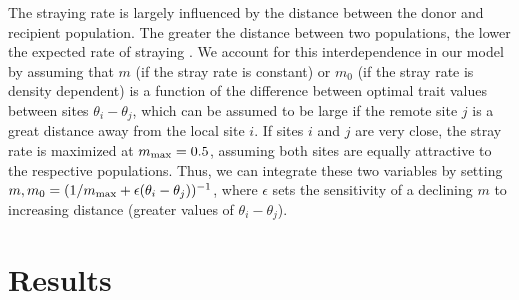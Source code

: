 \documentclass[twocolumn,preprintnumbers,amsmath,amssymb,superscriptaddress]{revtex4}
\begin{document}
The straying rate is largely influenced by the distance between the donor and recipient population.
The greater the distance between two populations, the lower the expected rate of straying \cite{H:2013fs,Westley:2015to}.
We account for this interdependence in our model by assuming that $m$ (if the stray rate is constant) or $m_0$ (if the stray rate is density dependent) is a function of the difference between optimal trait values between sites $\theta_i-\theta_j$, which can be assumed to be large if the remote site $j$ is a great distance away from the local site $i$.
If sites $i$ and $j$ are very close, the stray rate is maximized at $m_{\rm max} = 0.5$, assuming both sites are equally attractive to the respective populations.
Thus, we can integrate these two variables by setting $m,m_0 = (1/m_{\rm max} + \epsilon (\theta_i-\theta_j))^{-1}$, where $\epsilon$ sets the sensitivity of a declining $m$ to increasing distance (greater values of $\theta_i-\theta_j$).


\section{Results}

\end{document}
